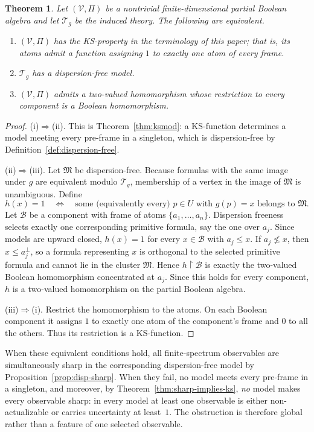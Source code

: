 \documentclass{article}   	%
\theoremstyle{plain}
\newtheorem{theorem}{Theorem}[section]
\theoremstyle{definition}
\theoremstyle{remark}
\begin{document}
\begin{theorem}
\label{thm:dispfree}
Let $(\mathcal V,\Pi)$ be a nontrivial finite-dimensional partial Boolean
algebra and let $\mathcal T_g$ be the induced theory.  The following are
equivalent.
\begin{enumerate}
\item[(i)] $(\mathcal V,\Pi)$ has the KS-property in the terminology of this
paper; that is, its atoms admit a function assigning $1$ to exactly one atom of
every frame.
\item[(ii)] $\mathcal T_g$ has a dispersion-free model.
\item[(iii)] $(\mathcal V,\Pi)$ admits a two-valued homomorphism whose
restriction to every component is a Boolean homomorphism.
\end{enumerate}
\end{theorem}

\begin{proof}
(i)$\Rightarrow$(ii).
This is Theorem~\ref{thm:ksmod}: a KS-function determines a model meeting every
pre-frame in a singleton, which is dispersion-free by
Definition~\ref{def:dispersion-free}.

(ii)$\Rightarrow$(iii).
Let $\mathfrak M$ be dispersion-free.  Because formulas with the same image
under $g$ are equivalent modulo $\mathcal T_g$, membership of a vertex in the
image of $\mathfrak M$ is unambiguous.  Define
\[
h(x)=1
\quad\Longleftrightarrow\quad
\text{some (equivalently every) }p\in U\text{ with }g(p)=x
\text{ belongs to }\mathfrak M.
\]
Let $\mathcal B$ be a component with frame of atoms
$\{a_1,\dots,a_n\}$.  Dispersion freeness selects exactly one corresponding
primitive formula, say the one over $a_j$.  Since models are upward closed,
$h(x)=1$ for every $x\in\mathcal B$ with $a_j\le x$.  If $a_j\not\le x$, then
$x\le a_j^\perp$, so a formula representing $x$ is orthogonal to the selected
primitive formula and cannot lie in the cluster $\mathfrak M$.  Hence
$h\restriction\mathcal B$ is exactly the two-valued Boolean homomorphism
concentrated at $a_j$.  Since this holds for every component, $h$ is a
two-valued homomorphism on the partial Boolean algebra.

(iii)$\Rightarrow$(i).
Restrict the homomorphism to the atoms.  On each Boolean component it assigns
$1$ to exactly one atom of the component's frame and $0$ to all the others.
Thus its restriction is a KS-function.
\end{proof}

When these equivalent conditions hold, all finite-spectrum observables are
simultaneously sharp in the corresponding dispersion-free model by
Proposition~\ref{prop:disp-sharp}.  When they fail, no model meets every
pre-frame in a singleton, and moreover, by
Theorem~\ref{thm:sharp-implies-ks}, \emph{no} model makes every observable
sharp: in every model at least one observable is either non-actualizable or
carries uncertainty at least~$1$.  The obstruction is therefore global rather
than a feature of one selected observable.
\end{document}
